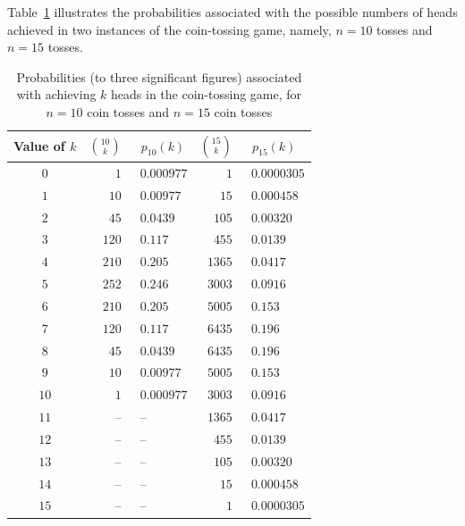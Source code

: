 Table~\ref{tab:select-replace} illustrates the probabilities associated with the possible numbers of {\sc head}s achieved in two instances of the coin-tossing game, namely, $n = 10$ tosses and $n= 15$ tosses.  
\begin{table}[htb]
\caption{Probabilities (to three significant figures) associated with achieving $k$ {\sc head}s in the coin-tossing game, for $n = 10$ coin tosses and $n= 15$ coin tosses}
\begin{center}
\label{tab:select-replace}
\begin{tabular}{|c||r|l||r|l|}
\hline
Value of $k$ & $\displaystyle {10 \choose k}$ & \ $p_{10}(k)$ 
& $\displaystyle {15 \choose k}$ & \ $p_{15}(k)$ \\
\hline
\hline
$0$   &   $  1$ & \ $0.000977$ &     $   1$ &  \ $0.0000305$ \\
$1$   &   $10$ & \   $0.00977$ &      $15$ &  \   $0.000458$ \\
$2$   &   $45$ & \     $0.0439$ &    $105$ &  \     $0.00320$ \\
$3$   & $120$ & \       $0.117$ &    $455$ &  \       $0.0139$ \\
$4$   & $210$ & \      $0.205$ &   $1365$ &  \       $0.0417$ \\
$5$   & $252$ & \      $0.246$ &   $3003$ &  \       $0.0916$ \\
$6$   & $210$ & \      $0.205$ &   $5005$ &  \         $0.153$ \\
$7$   & $120$ & \      $0.117$ &   $6435$ &  \         $0.196$ \\
$8$   &   $45$ & \    $0.0439$ &   $6435$ &  \         $0.196$ \\
$9$   &   $10$ & \  $0.00977$ &   $5005$ & \          $0.153$ \\
$10$ &     $1$ & \ $0.000977$ &  $3003$ & \        $0.0916$ \\
$11$ & --        & \ --                  &   $1365$ & \        $0.0417$ \\
$12$ & --        & \ --                 &      $455$ & \        $0.0139$ \\
$13$ & --       & \ --                  &      $105$ & \      $0.00320$ \\
$14$ & --       & \ --                  &        $15$ & \    $0.000458$ \\
$15$ & --       & \ --                  &          $1$ & \  $0.0000305$  \\
\hline
\end{tabular}
\end{center}
\end{table}

